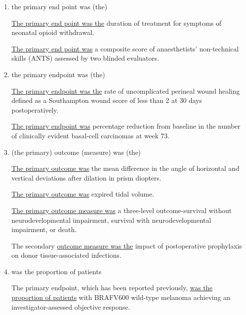 \documentclass[a4paper]{ctexbook}
\begin{document}
    \begin{enumerate}
      \item the primary end point was (the)
      \begin{eg}{}
        \uline{The primary end point was the} duration of treatment for symptoms of neonatal opioid withdrawal.        
      \end{eg}

      \begin{eg}{}
        \uline{The primary end point was} a composite score of anaesthetists' non-technical skills (ANTS) assessed by two blinded evaluators.   
      \end{eg}
      
      \item the primary endpoint was (the)
      \begin{eg}{}
        \uline{The primary endpoint was the} rate of uncomplicated perineal wound healing defined as a Southampton wound score of less than 2 at 30 days postoperatively.   
      \end{eg}

      \begin{eg}{}
        \uline{The primary endpoint was} percentage reduction from baseline in the number of clinically evident basal-cell carcinomas at week 73.   
      \end{eg}

      \item (the primary) outcome (measure) was (the)
      \begin{eg}{}
        \uline{The primary outcome was} the mean difference in the angle of horizontal and vertical deviations after dilation in prism diopters.   
      \end{eg}
      \begin{eg}{}
        \uline{The primary outcome was} expired tidal volume.   
      \end{eg}
      \begin{eg}{}
        \uline{The primary outcome measure was} a three-level outcome-survival without neurodevelopmental impairment, survival with neurodevelopmental impairment, or death. 
      \end{eg}
      \begin{eg}{}
        The secondary \uline{outcome measure was the} impact of postoperative prophylaxis on donor tissue-associated infections.   
      \end{eg}

      \item was the proportion of patients
      \begin{eg}{}
        The primary endpoint, which has been reported previously, \uline{was the proportion of patients} with BRAFV600 wild-type melanoma achieving an investigator-assessed objective response.
      \end{eg}


\end{enumerate}
\end{document}
